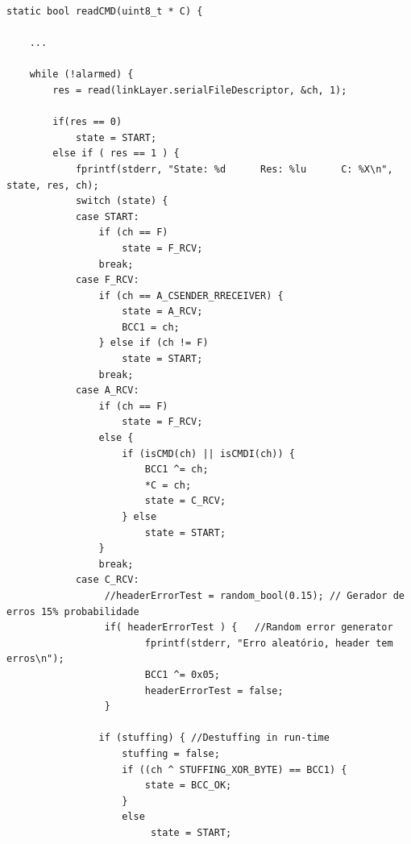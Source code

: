 \documentclass[a4paper]{article}
\begin{document}
\begin{verbatim}
static bool readCMD(uint8_t * C) {

    ...

    while (!alarmed) {
        res = read(linkLayer.serialFileDescriptor, &ch, 1);

        if(res == 0)
            state = START;
        else if ( res == 1 ) {
            fprintf(stderr, "State: %d      Res: %lu      C: %X\n", state, res, ch);
            switch (state) {
            case START:
                if (ch == F)
                    state = F_RCV;
                break;
            case F_RCV:
                if (ch == A_CSENDER_RRECEIVER) {
                    state = A_RCV;
                    BCC1 = ch;
                } else if (ch != F)
                    state = START;
                break;
            case A_RCV:
                if (ch == F)
                    state = F_RCV;
                else {
                    if (isCMD(ch) || isCMDI(ch)) {
                        BCC1 ^= ch;
                        *C = ch;
                        state = C_RCV;
                    } else
                        state = START;
                }
                break;
            case C_RCV:
                 //headerErrorTest = random_bool(0.15); // Gerador de erros 15% probabilidade
                 if( headerErrorTest ) {   //Random error generator
                        fprintf(stderr, "Erro aleatório, header tem erros\n");
                        BCC1 ^= 0x05;
                        headerErrorTest = false;
                 }

                if (stuffing) { //Destuffing in run-time
                    stuffing = false;
                    if ((ch ^ STUFFING_XOR_BYTE) == BCC1) {
                        state = BCC_OK;
                    }
                    else
                         state = START;


\end{verbatim}
\end{document}
